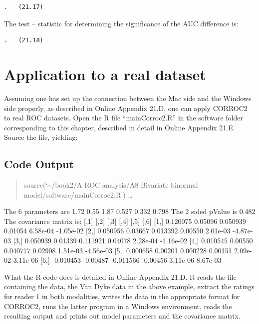 \documentclass[
]{book}
\begin{document}
\begin{verbatim}
.   (21.17)
\end{verbatim}

The test -- statistic for determining the significance of the AUC difference is:

\begin{verbatim}
.   (21.18)
\end{verbatim}

\hypertarget{bivariate-binormal-model-corroc2-application}{%
\section{Application to a real dataset}\label{bivariate-binormal-model-corroc2-application}}

Assuming one has set up the connection between the Mac side and the Windows side properly, as described in Online Appendix 21.D, one can apply CORROC2 to real ROC datasets. Open the R file ``mainCorroc2.R'' in the software folder corresponding to this chapter, described in detail in Online Appendix 21.E. Source the file, yielding:

\hypertarget{bivariate-binormal-model-corroc2-application-code-output}{%
\subsection{Code Output}\label{bivariate-binormal-model-corroc2-application-code-output}}

\begin{quote}
source(`\textasciitilde/book2/A ROC analysis/A8 Bivariate binormal model/software/mainCorroc2.R')
\ldots{}
\end{quote}

The 6 parameters are 1.72 0.55 1.87 0.527 0.332 0.798
The 2 sided pValue is 0.482
The covariance matrix is:
{[},1{]} {[},2{]} {[},3{]} {[},4{]} {[},5{]} {[},6{]}
{[}1,{]} 0.120075 0.05096 0.050939 0.01054 6.58e-04 -1.05e-02
{[}2,{]} 0.050956 0.03667 0.013392 0.00550 2.01e-03 -4.87e-03
{[}3,{]} 0.050939 0.01339 0.111921 0.04078 2.28e-04 -1.16e-02
{[}4,{]} 0.010545 0.00550 0.040777 0.02908 1.51e-03 -4.56e-03
{[}5,{]} 0.000658 0.00201 0.000228 0.00151 2.09e-02 3.11e-06
{[}6,{]} -0.010453 -0.00487 -0.011566 -0.00456 3.11e-06 8.67e-03

What the R code does is detailed in Online Appendix 21.D. It reads the file containing the data, the Van Dyke data in the above example, extract the ratings for reader 1 in both modalities, writes the data in the appropriate format for CORROC2, runs the latter program in a Windows environment, reads the resulting output and prints out model parameters and the covariance matrix.
\end{document}
